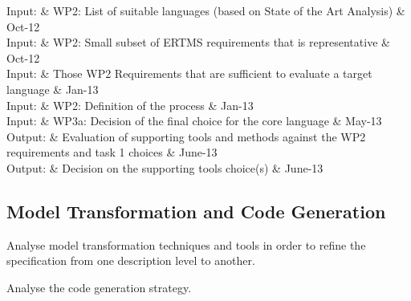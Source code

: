 \documentclass{template/openetcs_article}
\begin{document}
\begin{inoutput}
Input: & WP2: List of suitable languages (based on State of the Art Analysis) & Oct-12 \\
Input: & WP2: Small subset of ERTMS requirements that is representative & Oct-12 \\
Input: & Those WP2 Requirements that are sufficient to evaluate a target language & Jan-13 \\
Input: & WP2: Definition of the process & Jan-13 \\
Input: & WP3a: Decision of the final choice for the core language & May-13 \\
\hline
Output: & Evaluation of supporting tools and methods against the WP2 requirements and task 1 choices & June-13 \\
Output: & Decision on the supporting tools choice(s) & June-13 \\
\end{inoutput}


\subsection{Model Transformation and Code Generation}

Analyse model transformation techniques and tools in order to refine the specification from one description level to another.



Analyse the code generation strategy.
\end{document}
